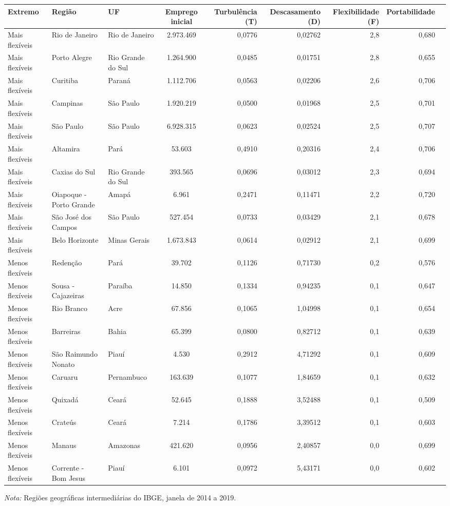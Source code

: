 \providecommand{\toprule}{\hline\hline}
\providecommand{\midrule}{\hline}
\providecommand{\bottomrule}{\hline\hline}
\providecommand{\addlinespace}[1][]{}
{\small
\renewcommand{\arraystretch}{1.12}
\begin{tabular}{lllcrrrrr}
\toprule
Extremo & Região & UF & Emprego inicial & Turbulência (T) & Descasamento (D) & Flexibilidade (F) & Portabilidade \\
\midrule
Mais flexíveis & Rio de Janeiro & Rio de Janeiro & 2.973.469 & 0,0776 & 0,02762 & 2,8 & 0,680 \\
Mais flexíveis & Porto Alegre & Rio Grande do Sul & 1.264.900 & 0,0485 & 0,01751 & 2,8 & 0,655 \\
Mais flexíveis & Curitiba & Paraná & 1.112.706 & 0,0563 & 0,02206 & 2,6 & 0,706 \\
Mais flexíveis & Campinas & São Paulo & 1.920.219 & 0,0500 & 0,01968 & 2,5 & 0,701 \\
Mais flexíveis & São Paulo & São Paulo & 6.928.315 & 0,0623 & 0,02524 & 2,5 & 0,707 \\
Mais flexíveis & Altamira & Pará & 53.603 & 0,4910 & 0,20316 & 2,4 & 0,706 \\
Mais flexíveis & Caxias do Sul & Rio Grande do Sul & 393.565 & 0,0696 & 0,03012 & 2,3 & 0,694 \\
Mais flexíveis & Oiapoque - Porto Grande & Amapá & 6.961 & 0,2471 & 0,11471 & 2,2 & 0,720 \\
Mais flexíveis & São José dos Campos & São Paulo & 527.454 & 0,0733 & 0,03429 & 2,1 & 0,678 \\
Mais flexíveis & Belo Horizonte & Minas Gerais & 1.673.843 & 0,0614 & 0,02912 & 2,1 & 0,699 \\
\addlinespace[3pt]
Menos flexíveis & Redenção & Pará & 39.702 & 0,1126 & 0,71730 & 0,2 & 0,576 \\
Menos flexíveis & Sousa - Cajazeiras & Paraíba & 14.850 & 0,1334 & 0,94235 & 0,1 & 0,647 \\
Menos flexíveis & Rio Branco & Acre & 67.856 & 0,1065 & 1,04998 & 0,1 & 0,654 \\
Menos flexíveis & Barreiras & Bahia & 65.399 & 0,0800 & 0,82712 & 0,1 & 0,639 \\
Menos flexíveis & São Raimundo Nonato & Piauí & 4.530 & 0,2912 & 4,71292 & 0,1 & 0,609 \\
Menos flexíveis & Caruaru & Pernambuco & 163.639 & 0,1077 & 1,84659 & 0,1 & 0,632 \\
Menos flexíveis & Quixadá & Ceará & 52.645 & 0,1888 & 3,52488 & 0,1 & 0,509 \\
Menos flexíveis & Crateús & Ceará & 7.214 & 0,1786 & 3,39512 & 0,1 & 0,603 \\
Menos flexíveis & Manaus & Amazonas & 421.620 & 0,0956 & 2,40857 & 0,0 & 0,699 \\
Menos flexíveis & Corrente - Bom Jesus & Piauí & 6.101 & 0,0972 & 5,43171 & 0,0 & 0,602 \\
\bottomrule
\end{tabular}
\vspace{2pt}
\par{\footnotesize \textit{Nota:} Regiões geográficas intermediárias do IBGE, janela de 2014 a 2019.}
}
